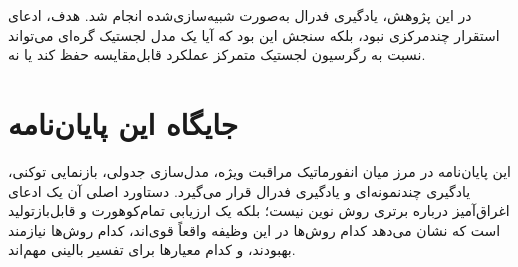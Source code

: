 در این پژوهش، یادگیری فدرال به‌صورت شبیه‌سازی‌شده انجام شد. هدف، ادعای استقرار چندمرکزی نبود، بلکه سنجش این بود که آیا یک مدل لجستیک گره‌ای می‌تواند نسبت به رگرسیون لجستیک متمرکز عملکرد قابل‌مقایسه حفظ کند یا نه.

\section{جایگاه این پایان‌نامه}
این پایان‌نامه در مرز میان انفورماتیک مراقبت ویژه، مدل‌سازی جدولی، بازنمایی توکنی، یادگیری چندنمونه‌ای و یادگیری فدرال قرار می‌گیرد. دستاورد اصلی آن یک ادعای اغراق‌آمیز درباره برتری روش نوین نیست؛ بلکه یک ارزیابی تمام‌کوهورت و قابل‌بازتولید است که نشان می‌دهد کدام روش‌ها در این وظیفه واقعاً قوی‌اند، کدام روش‌ها نیازمند بهبودند، و کدام معیارها برای تفسیر بالینی مهم‌اند.
